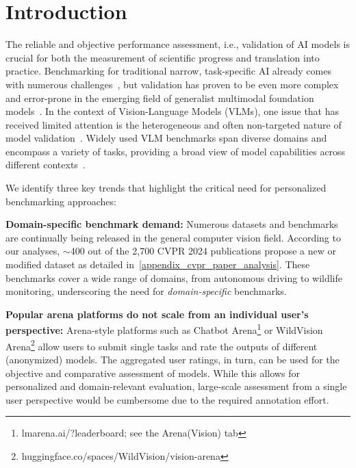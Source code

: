 
\section{Introduction}
\label{sec:intro}
The reliable and objective performance assessment, i.e., validation of AI models is crucial for both the measurement of scientific progress and translation into practice. Benchmarking for traditional narrow, task-specific AI already comes with numerous challenges~\cite{myllyaho2021systematic}, but validation has proven to be even more complex and error-prone in the emerging field of generalist multimodal foundation models~\cite{schaeffer2024areemergent}. In the context of Vision-Language Models (VLMs), one issue that has received limited attention is the heterogeneous and often non-targeted nature of model validation~\cite{tong2024cambrian1fullyopenvisioncentric, tong2024eyes}. Widely used VLM benchmarks span diverse domains and encompass a variety of tasks, providing a broad view of model capabilities across different contexts~\cite{fu2024blink,liu2024mmbench,ying2024mmtbench,altahan2024unibench,yue2023mmmu}. 

We identify three key trends that highlight the critical need for personalized benchmarking approaches:

\textbf{Domain-specific benchmark demand:} Numerous datasets and benchmarks are continually being released in the general computer vision field. According to our analyses,  $\sim$400 out of the 2,700 CVPR 2024 publications propose a new or modified dataset as detailed in~\cref{appendix_cvpr_paper_analysis}. These benchmarks cover a wide range of domains, from autonomous driving to wildlife monitoring, underscoring the need for \textit{domain-specific} benchmarks.

\textbf{Popular arena platforms do not scale from an individual user’s perspective:}
Arena-style platforms such as Chatbot Arena\footnote{lmarena.ai/?leaderboard; see the Arena(Vision) tab} or WildVision Arena\footnote{huggingface.co/spaces/WildVision/vision-arena} allow users to submit single tasks and rate the outputs of different (anonymized) models. The aggregated user ratings, in turn, can be used for the objective and comparative assessment of models. While this allows for personalized and domain-relevant evaluation, large-scale assessment from a single user perspective would be cumbersome due to the required annotation effort.

